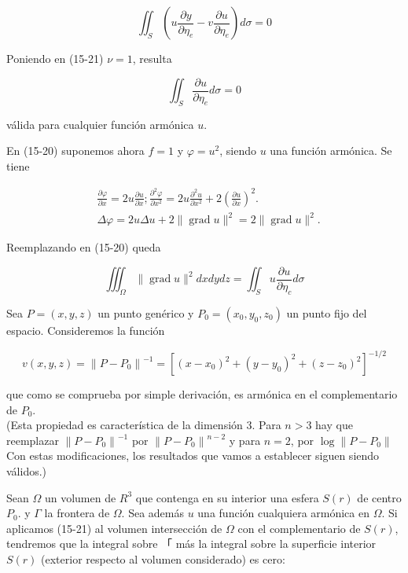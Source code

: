 \documentclass[10pt]{article}
\theoremstyle{plain}
\theoremstyle{definition}
\theoremstyle{remark}
\begin{document}
\begin{equation*}
\iint_{S}\left(u \frac{\partial y}{\partial \eta_{e}}-v \frac{\partial u}{\partial \eta_{e}}\right) d \sigma=0 \tag{15-21}
\end{equation*}


Poniendo en (15-21) $\nu=1$, resulta


\begin{equation*}
\iint_{S} \frac{\partial u}{\partial \eta_{e}} d \sigma=0 \tag{15-22}
\end{equation*}


válida para cualquier función armónica $u$.

En (15-20) suponemos ahora $f=1$ y $\varphi=u^{2}$, siendo $u$ una función armónica. Se tiene

$$
\begin{aligned}
& \frac{\partial \varphi}{\partial x}=2 u \frac{\partial u}{\partial x} ; \frac{\partial^{2} \varphi}{\partial x^{2}}=2 u \frac{\partial^{2} u}{\partial x^{2}}+2\left(\frac{\partial u}{\partial x}\right)^{2} . \\
& \Delta \varphi=2 u \Delta u+2\|\operatorname{grad} u\|^{2}=2\|\operatorname{grad} u\|^{2} .
\end{aligned}
$$

Reemplazando en (15-20) queda


\begin{equation*}
\iiint_{\Omega}\|\operatorname{grad} u\|^{2} d x d y d z=\iint_{S} u \frac{\partial u}{\partial \eta_{c}} d \sigma \tag{15-23}
\end{equation*}


Sea $P=(x, y, z)$ un punto genérico y $P_{0}=\left(x_{0}, y_{0}, z_{0}\right)$ un punto fijo del espacio. Consideremos la función

$$
v(x, y, z)=\left\|P-P_{0}\right\|^{-1}=\left[\left(x-x_{0}\right)^{2}+\left(y-y_{0}\right)^{2}+\left(z-z_{0}\right)^{2}\right]^{-1 / 2}
$$

que como se comprueba por simple derivación, es armónica en el complementario de $P_{0}$.\\
(Esta propiedad es característica de la dimensión 3. Para $n>3$ hay que reemplazar $\left\|P-P_{0}\right\|^{-1}$ por $\left\|P-P_{0}\right\|^{n-2}$ y para $n=2$, por $\log \left\|P-P_{0}\right\|$ Con estas modificaciones, los resultados que vamos a establecer siguen siendo válidos.)

Sean $\Omega$ un volumen de $R^{3}$ que contenga en su interior una esfera $S(r)$ de centro $P_{0}$. y $\Gamma$ la frontera de $\Omega$. Sea además $u$ una función cualquiera armónica en $\Omega$. Si aplicamos (15-21) al volumen intersección de $\Omega$ con el complementario de $S(r)$, tendremos que la integral sobre 「 más la integral sobre la superficie interior $S(r)$ (exterior respecto al volumen considerado) es cero:
\end{document}
